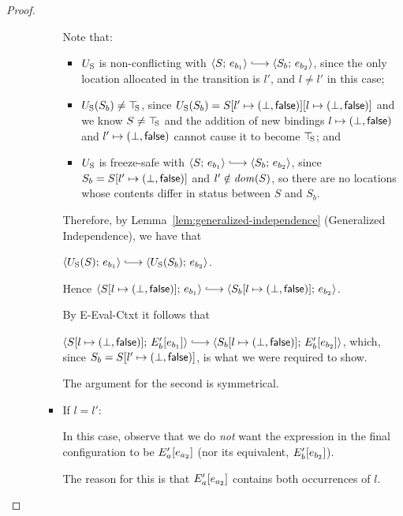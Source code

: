 \begin{proof}
\begin{enumerate}
\begin{enumerate}
\begin{itemize}
        Note that:
        \begin{itemize}
        \item $U_{\mathrm{S}}$ is non-conflicting with $\config{S}{e_{b_1}}
          \parstepsto \config{S_b}{e_{b_2}}$, since the only
          location allocated in the transition is $l'$, and $l
          \neq l'$ in this case;
        \item $U_{\mathrm{S}}(S_b) \neq \top\hspace{-0.85mm}_{\mathrm{S}}$, since $U_{\mathrm{S}}(S_b) =
          S[l' \mapsto (\bot, \textsf{false})][l \mapsto (\bot, \textsf{false})]$
          and we know $S \neq \top\hspace{-0.85mm}_{\mathrm{S}}$ and the addition of new
          bindings $l \mapsto (\bot, \textsf{false})$ and
          $l' \mapsto (\bot, \textsf{false})$ cannot cause it to
          become $\top\hspace{-0.85mm}_{\mathrm{S}}$; and
        \item $U_{\mathrm{S}}$ is freeze-safe with $\config{S}{e_{b_1}}
          \parstepsto \config{S_b}{e_{b_2}}$, since $S_b =
          S[l' \mapsto (\bot, \textsf{false})]$ and $l' \notin \mathit{dom}(S)$,
          so there are no locations whose contents differ in status
          between $S$ and $S_b$.
        \end{itemize}

        Therefore, by Lemma~\ref{lem:generalized-independence}
        (Generalized Independence), we have that

        $\config{\Ustore(S)}{e_{b_1}} \parstepsto
        \config{\Ustore(S_b)}{e_{b_2}}$.

        Hence $\config{\extS{S}{l}{\bot}{\frozenfalse}}{e_{b_1}}
        \parstepsto
        \config{\extS{S_b}{l}{\bot}{\frozenfalse}}{e_{b_2}}$.

        By {\sc E-Eval-Ctxt} it follows that

        $\config{\extS{S}{l}{\bot}{\frozenfalse}}{\evalctxt{E'_b}{e_{b_1}}}
        \parstepsto
        \config{\extS{S_b}{l}{\bot}{\frozenfalse}}{\evalctxt{E'_b}{e_{b_2}}}$,
        which, since $S_b = S[l' \mapsto (\bot, \textsf{false})]$, is what
        we were required to show.

        The argument for the second is symmetrical.

      \item If $l = l'$:

        In this case, observe that we do \emph{not} want the
        expression in the final configuration to be
        $E'_a\hspace{-0.5mm}\left[e_{a_2}\right]$ (nor its equivalent,
        $E'_b\hspace{-0.5mm}\left[e_{b_2}\right]$).

        The reason for this is that $E'_a\hspace{-0.5mm}\left[e_{a_2}\right]$
        contains both occurrences of $l$.


\end{itemize}
\end{enumerate}
\end{enumerate}
\end{proof}
